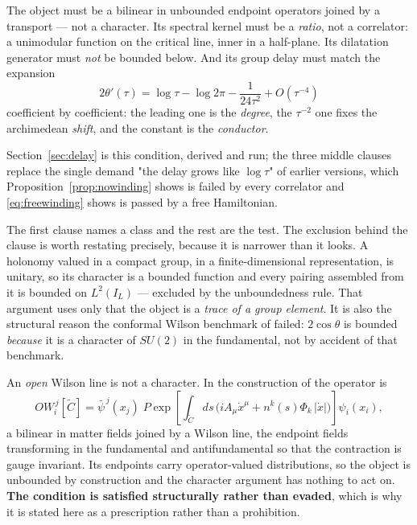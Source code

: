 \begin{condition}\label{cond:bilinear}
The object must be a bilinear in unbounded endpoint operators joined by a
transport --- not a character. Its spectral kernel must be a \emph{ratio}, not a
correlator: a unimodular function on the critical line, inner in a half-plane.
Its dilatation generator must \emph{not} be bounded below. And its group delay
must match the expansion
\[
 2\theta'(\tau)=\log\tau-\log2\pi-\frac1{24\tau^2}+O(\tau^{-4})
\]
coefficient by coefficient: the leading one is the \emph{degree}, the $\tau^{-2}$
one fixes the archimedean \emph{shift}, and the constant is the \emph{conductor}.
\end{condition}

Section~\ref{sec:delay} is this condition, derived and run; the three middle
clauses replace the single demand "the delay grows like $\log\tau$" of earlier
versions, which Proposition~\ref{prop:nowinding} shows is failed by every
correlator and \eqref{eq:freewinding} shows is passed by a free Hamiltonian.

The first clause names a class and the rest are the test. The exclusion behind
the clause is worth restating precisely, because it is narrower than it looks. A
holonomy valued in a compact group, in a finite-dimensional representation, is
unitary, so its character is a bounded function and every pairing assembled from
it is bounded on $L^2(I_L)$ --- excluded by the unboundedness rule. That argument
uses only that the object is a \emph{trace of a group element}. It is also the
structural reason the conformal Wilson benchmark of \cite{Selection} failed:
$2\cos\theta$ is bounded \emph{because} it is a character of $SU(2)$ in the
fundamental, not by accident of that benchmark.

An \emph{open} Wilson line is not a character. In the construction of
\cite{OWL} the operator is
\[
 OW_i^{\,j}[\tilde C]=\bar\psi^{\,j}(x_j)\;
 P\exp\!\left[\int_{\tilde C}\!ds\,\Big(iA_\mu\dot x^\mu
 +n^k(s)\Phi_k\,|\dot x|\Big)\right]\psi_i(x_i),
\]
a bilinear in matter fields joined by a Wilson line, the endpoint fields
transforming in the fundamental and antifundamental so that the contraction is
gauge invariant. Its endpoints carry operator-valued distributions, so the object
is unbounded by construction and the character argument has nothing to act on.
\textbf{The condition is satisfied structurally rather than evaded}, which is why
it is stated here as a prescription rather than a prohibition.

